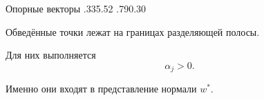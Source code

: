 \SPBGSplitSlide
  {Опорные векторы}
  {.335}{.52}
  {%
    \ReportSvmSupportVectors
  }
  {.790}{.30}
  {%
    \SplitBody
    Обведённые точки лежат на границах разделяющей полосы.

    \vspace{.35cm}
    Для них выполняется
    \[
      \alpha_j>0.
    \]

    \vspace{.25cm}
    Именно они входят в представление нормали \(w^*\).
  }
